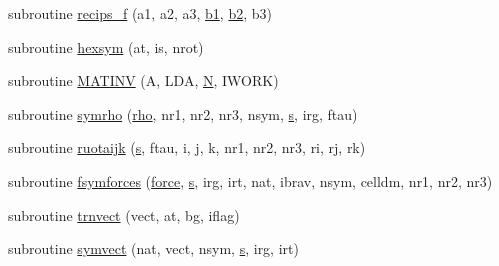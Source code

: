 \begin{DoxyCompactItemize}
\item 
subroutine \hyperlink{black__box_8f_ad3fc0544fbbbdb65fb71fa8b807e8bcc}{recips\-\_\-f} (a1, a2, a3, \hyperlink{recips_8h_a3fc234f2038c252e1843e0e73b6025ac}{b1}, \hyperlink{recips_8h_aab3153114ef2102cc57095ccea37652a}{b2}, b3)
\item 
subroutine \hyperlink{black__box_8f_a17f2dc5a6fa1126aab5d44a3ddcd4dc3}{hexsym} (at, is, nrot)
\item 
subroutine \hyperlink{black__box_8f_a81d5244310858521e5daf4ce1c647cd9}{M\-A\-T\-I\-N\-V} (A, L\-D\-A, \hyperlink{lda__c__2d__prm_8c_a67af716b12fead5a86898ad074a0b959}{N}, I\-W\-O\-R\-K)
\item 
subroutine \hyperlink{black__box_8f_a0a0a35b0defdc789dd7c88e3df5ad1f1}{symrho} (\hyperlink{md_8h_a52b35cee8a5db846ce98f4904e1c8b13}{rho}, nr1, nr2, nr3, nsym, \hyperlink{_t_d_d_f_t_2_common_2init__wf__gaussian_8c_ac9562ee4ecb3b8aeebeb04656e7e57a9}{s}, irg, ftau)
\item 
subroutine \hyperlink{black__box_8f_a05997fd7c98525baf7efb44b1d0c0834}{ruotaijk} (\hyperlink{_t_d_d_f_t_2_common_2init__wf__gaussian_8c_ac9562ee4ecb3b8aeebeb04656e7e57a9}{s}, ftau, i, j, k, nr1, nr2, nr3, ri, rj, rk)
\item 
subroutine \hyperlink{black__box_8f_a406651d953cb4cb2a66b9d0e2bfc4e73}{fsymforces} (\hyperlink{md_8h_a49a389c53ad83899d80e3267c66994df}{force}, \hyperlink{_t_d_d_f_t_2_common_2init__wf__gaussian_8c_ac9562ee4ecb3b8aeebeb04656e7e57a9}{s}, irg, irt, nat, ibrav, nsym, celldm, nr1, nr2, nr3)
\item 
subroutine \hyperlink{black__box_8f_a54d893335e89f24c25146f70932d4123}{trnvect} (vect, at, bg, iflag)
\item 
subroutine \hyperlink{black__box_8f_a42b2b8fe49edb0c548caf9c52bc2cc6b}{symvect} (nat, vect, nsym, \hyperlink{_t_d_d_f_t_2_common_2init__wf__gaussian_8c_ac9562ee4ecb3b8aeebeb04656e7e57a9}{s}, irg, irt)
\end{DoxyCompactItemize}


